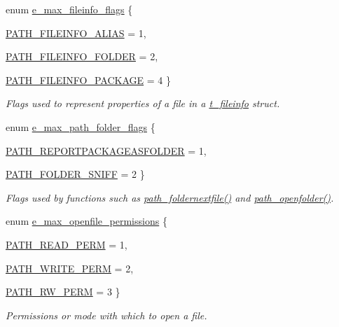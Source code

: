 \begin{DoxyCompactItemize}
enum \hyperlink{group__files_gaad4b197d6bb36cf68616a756fa85f1be}{e\_\-max\_\-fileinfo\_\-flags} \{ \par
\hyperlink{group__files_ggaad4b197d6bb36cf68616a756fa85f1bea2c5109b5474f11e41c65e2e57de79fdd}{PATH\_\-FILEINFO\_\-ALIAS} =  1, 
\par
\hyperlink{group__files_ggaad4b197d6bb36cf68616a756fa85f1bead5a11a36a5c941eb59e9611cbb3c2148}{PATH\_\-FILEINFO\_\-FOLDER} =  2, 
\par
\hyperlink{group__files_ggaad4b197d6bb36cf68616a756fa85f1bea499de508df9c185edcb35a88c9ad9f36}{PATH\_\-FILEINFO\_\-PACKAGE} =  4
 \}
\begin{DoxyCompactList}\small\item\em Flags used to represent properties of a file in a \hyperlink{structt__fileinfo}{t\_\-fileinfo} struct. \item\end{DoxyCompactList}\item 
enum \hyperlink{group__files_ga9ed75cc34f42beefdd8d3075ae2dbe53}{e\_\-max\_\-path\_\-folder\_\-flags} \{ \par
\hyperlink{group__files_gga9ed75cc34f42beefdd8d3075ae2dbe53a6e0269209195a9068f33b2783df0cd19}{PATH\_\-REPORTPACKAGEASFOLDER} =  1, 
\par
\hyperlink{group__files_gga9ed75cc34f42beefdd8d3075ae2dbe53a62529aabdc660c87b795a0040ff95ca8}{PATH\_\-FOLDER\_\-SNIFF} =  2
 \}
\begin{DoxyCompactList}\small\item\em Flags used by functions such as \hyperlink{group__files_ga50f5d1b1d008024bffd65155be7e2721}{path\_\-foldernextfile()} and \hyperlink{group__files_ga80aa97732be321d9f2e2212485e0367a}{path\_\-openfolder()}. \item\end{DoxyCompactList}\item 
enum \hyperlink{group__files_ga51fbee9f65e7ece2cae5c1e34150b7b3}{e\_\-max\_\-openfile\_\-permissions} \{ \par
\hyperlink{group__files_gga51fbee9f65e7ece2cae5c1e34150b7b3a25b52ce173061081c84ef4706cbe8d0e}{PATH\_\-READ\_\-PERM} =  1, 
\par
\hyperlink{group__files_gga51fbee9f65e7ece2cae5c1e34150b7b3a9ae5da0a7f6b87b3a70e7c6778217cab}{PATH\_\-WRITE\_\-PERM} =  2, 
\par
\hyperlink{group__files_gga51fbee9f65e7ece2cae5c1e34150b7b3aa001dfc0c560b26b5a4a01cb40b6081c}{PATH\_\-RW\_\-PERM} =  3
 \}
\begin{DoxyCompactList}\small\item\em Permissions or mode with which to open a file. \item\end{DoxyCompactList}\item 

\end{DoxyCompactItemize}
